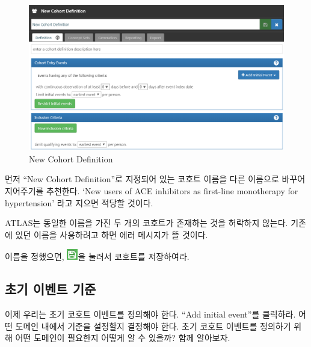\documentclass[11pt]{book}
\theoremstyle{definition}
\theoremstyle{definition}
\theoremstyle{definition}
\theoremstyle{remark}
\let\BeginKnitrBlock\begin \let\EndKnitrBlock\end
\begin{document}
\begin{figure}

{\centering \includegraphics[width=1\linewidth]{images/Cohorts/ATLAS-defineacohort} 

}

\caption{New Cohort Definition}\label{fig:ATLASdefineacohort}
\end{figure}

먼저 ``New Cohort Definition''로 지정되어 있는 코호트 이름을 다른
이름으로 바꾸어 지어주기를 추천한다. `New users of ACE inhibitors as
first-line monotherapy for hypertension' 라고 지으면 적당할 것이다.

\BeginKnitrBlock{rmdimportant}
ATLAS는 동일한 이름을 가진 두 개의 코호트가 존재하는 것을 허락하지
않는다. 기존에 있던 이름을 사용하려고 하면 에러 메시지가 뜰 것이다.
\EndKnitrBlock{rmdimportant}

이름을 정했으면, \includegraphics{images/Cohorts/save.png}을 눌러서
코호트를 저장하여라.

\subsection{초기 이벤트 기준}\label{--}

이제 우리는 초기 코호트 이벤트를 정의해야 한다. ``Add initial event''를
클릭하라. 어떤 도메인 내에서 기준을 설정할지 결정해야 한다. 초기 코호트
이벤트를 정의하기 위해 어떤 도메인이 필요한지 어떻게 알 수 있을까? 함께
알아보자.
\end{document}
